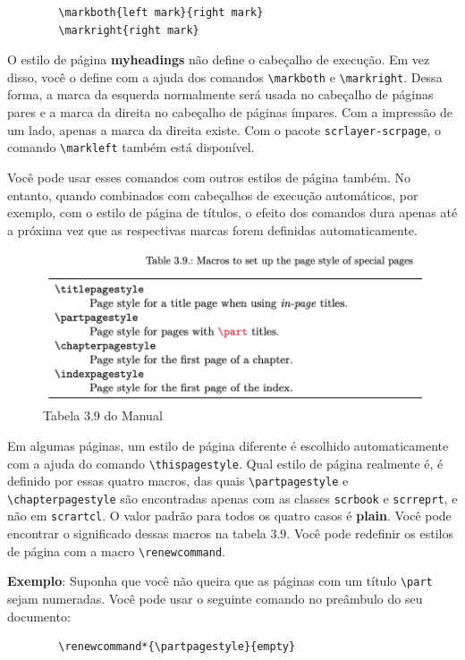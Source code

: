 \begin{verbatim}
        \markboth{left mark}{right mark}
        \markright{right mark}
\end{verbatim}

O estilo de página \textbf{myheadings} não define o cabeçalho de execução. Em vez disso, você o define com a ajuda dos comandos \verb|\markboth| e \verb|\markright|. Dessa forma, a marca da esquerda normalmente será usada no cabeçalho de páginas pares e a marca da direita no cabeçalho de páginas ímpares. Com a impressão de um lado, apenas a marca da direita existe. Com o pacote \texttt{scrlayer-scrpage}, o comando \verb|\markleft| também está disponível.

Você pode usar esses comandos com outros estilos de página também. No entanto, quando combinados com cabeçalhos de execução automáticos, por exemplo, com o estilo de página de títulos, o efeito dos comandos dura apenas até a próxima vez que as respectivas marcas forem definidas automaticamente.

\begin{figure}[ht]
    \centering
    \includegraphics[width=0.75\linewidth]{imagens/tab3_9.png}
    \caption{Tabela 3.9 do Manual}
    \label{fig:tab3_9}
\end{figure}

Em algumas páginas, um estilo de página diferente é escolhido automaticamente com a ajuda do comando \verb|\thispagestyle|. Qual estilo de página realmente é, é definido por essas quatro macros, das quais \verb|\partpagestyle| e \verb|\chapterpagestyle| são encontradas apenas com as classes \texttt{scrbook} e \texttt{scrreprt}, e não em \texttt{scrartcl}. O valor padrão para todos os quatro casos é \textbf{plain}. Você pode encontrar o significado dessas macros  na tabela 3.9. Você pode redefinir os estilos de página com a macro \verb|\renewcommand|.

\textbf{Exemplo}: Suponha que você não queira que as páginas com um título \verb|\part| sejam numeradas. Você pode usar o seguinte comando no preâmbulo do seu documento:
\begin{verbatim}
        \renewcommand*{\partpagestyle}{empty}
\end{verbatim}

